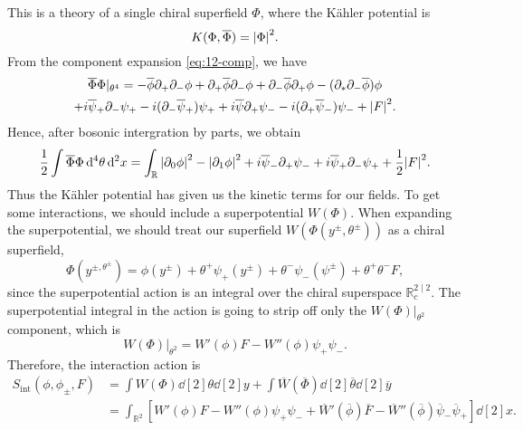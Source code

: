 This is a theory of a single chiral superfield $\Phi$, where the Kähler potential is 
\begin{equation}
  K(\Phi, \overline{\Phi}{}) = \abs{\Phi}^2.
\end{equation}
From the component expansion \eqref{eq:12-comp}, we have
\begin{multline}
  \overline{\Phi}{} \Phi\rvert_{\theta^4} = - \overline{\phi}{} \partial_+ \partial_- \phi + \partial_+ \overline{\phi}{} \partial_- \phi + \partial_- \overline{\phi}{} \partial_+ \phi - (\partial_* \partial_- \overline{\phi}{}) \phi \\
  + i \overline{\psi}{}_+ \partial_- \psi_+ - i (\partial_- \overline{\psi}{}_+) \psi_+ + i \overline{\psi}{} \partial_+ \psi_- - i (\partial_+ \overline{\psi}{}_-) \psi_- + \abs{F}^2.
\end{multline}
Hence, after bosonic intergration by parts, we obtain
\begin{equation}
  \frac{1}{2} \int \overline{\Phi}{} \Phi \dd[4]{\theta} \dd[2]{x} = \int_\mathbb{R} \abs{\partial_0 \phi}^2 - \abs{\partial_1 \phi}^2 + i \overline{\psi}{}_- \partial_+ \psi_- + i \overline{\psi}{}_+ \partial_- \psi_+ + \frac{1}{2} \abs{F}^2.
\end{equation}
Thus the Kähler potential has given us the kinetic terms for our fields. To get some interactions, we should include a superpotential $W(\Phi)$.
When expanding the superpotential, we should treat our superfield $W(\Phi (y^{\pm}, \theta^{\pm}))$ as a chiral superfield,
\begin{equation}
  \Phi(y^{\pm, \theta^{\pm}}) = \phi(y^{\pm}) + \theta^+ \psi_+ (y^{\pm}) + \theta^- \psi_- (\psi^{\pm}) + \theta ^+ \theta^- F,
\end{equation}
since the superpotential action is an integral over the chiral superspace $\mathbb{R}_c^{2 \mid 2}$.
The superpotential integral in the action is going to strip off only the $W(\Phi) \rvert_{\theta^2}$ component, which is
\begin{equation}
  W(\Phi) \rvert_{\theta^2} = W'(\phi) F - W'' (\phi) \psi_+ \psi_-.
\end{equation}
Therefore, the interaction action is
\begin{align}
  S_{\text{int}} (\phi, \phi_{\pm}, F) &= \int W(\Phi) \dd[2]{\theta} \dd[2]{y} + \int \overline{W} (\overline{\Phi}{}) \dd[2]{\overline{\theta}{}} \dd[2]{\overline{y}{}} \\
				       &= \int_{\mathbb{R}^2} \left[ W'(\phi) F - W''(\phi) \psi_+ \psi_- + \overline{W}{}' (\overline{\phi}{}) \overline{F}{} - \overline{W}{}'' (\overline{\phi}{}) \overline{\psi}{}_- \overline{\psi}{}_+ \right] \dd[2]{x}.
\end{align}
